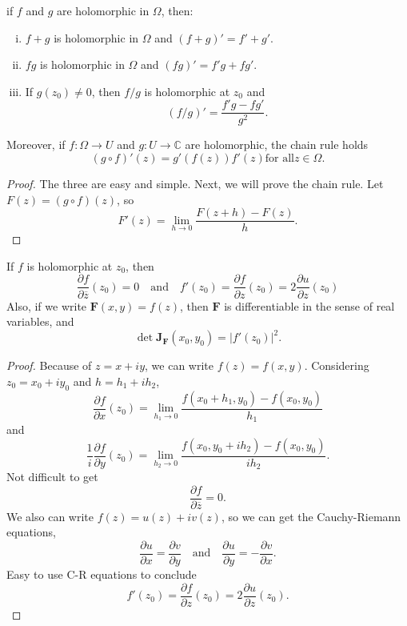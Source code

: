 \begin{proposition}
    if $f$ and $g$ are holomorphic in $\Omega$, then:
    \begin{enumerate}[(i)]
    \item $f+g$ is holomorphic in $\Omega$ and $(f+g)'=f'+g'$.
    \item $fg$ is holomorphic in $\Omega$ and $(fg)'=f'g+fg'$.
    \item If $g(z_0)\ne 0$, then $f/g$ is holomorphic at $z_0$ and
    \[
        (f/g)'=\frac{f'g-fg'}{g^2}.
    \]
    \end{enumerate}
    Moreover, if $f:\Omega\to U$ and $g:U\to\mathbb{C}$ are holomorphic, the chain
    rule holds
    \[
        (g\circ f)'(z)=g'(f(z))f'(z) \text{for all} z\in\Omega.
    \]
\end{proposition}
\begin{proof}
    The three are easy and simple. Next, we will prove the chain rule.
    Let $F(z) = (g\circ f)(z)$, so
    \[
        F'(z)=\lim_{h\to 0}\frac{F(z+h)-F(z)}{h}.
    \]
\end{proof}

\begin{proposition}
    If $f$ is holomorphic at $z_0$, then
    \[
        \frac{\partial f}{\partial \overline{z}}(z_0)=0\quad \text{and} \quad
        f'(z_0)=\frac{\partial f}{\partial z}(z_0)=2\frac{\partial u}{\partial z}(z_0)
    \]
    Also, if we write $\bm{F}(x,y)=f(z)$, then $\bm{F}$ is differentiable in the sense
    of real variables, and
    \[
        \det{{\bm J}_{\bm F}(x_0,y_0)}=|f'(z_0)|^2.
    \]
\end{proposition}
\begin{proof}
    Because of $z=x+iy$, we can write $f(z)=f(x,y)$. Considering $z_0=x_0+iy_0$ and $h=h_1+ih_2$,
    \[
        \frac{\partial f}{\partial x}(z_0)=
        \lim_{h_1\to 0}\frac{f(x_0+h_1,y_0)-f(x_0,y_0)}{h_1}
    \]
    and
    \[
        \frac{1}{i}\frac{\partial f}{\partial y}(z_0)=
        \lim_{h_2\to 0}\frac{f(x_0,y_0+ih_2)-f(x_0,y_0)}{ih_2}.
    \]
    Not difficult to get
    \[
        \frac{\partial f}{\partial\overline{z}}=0.
    \]
    We also can write $f(z)=u(z)+iv(z)$, so we can get the Cauchy-Riemann equations,
    \[
        \frac{\partial u}{\partial x}=\frac{\partial v}{\partial y}
        \quad \text{and} \quad
        \frac{\partial u}{\partial y}=-\frac{\partial v}{\partial x}.
    \]
    Easy to use C-R equations to conclude
    \[
        f'(z_0)=\frac{\partial f}{\partial z}(z_0)=2\frac{\partial u}{\partial z}(z_0).
    \]
\end{proof}

